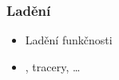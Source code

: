 


\subtitle{X. Gdb a ladění výkonnosti}
\date{22. 11. \the\year}




\frame{\titlepage}


\begin{frame}
  \frametitle{Ladění}

  \begin{itemize}
    \item Ladění funkčnosti
    \item {}, tracery, \dots
  \end{itemize}

  \tableofcontents

\end{frame}




